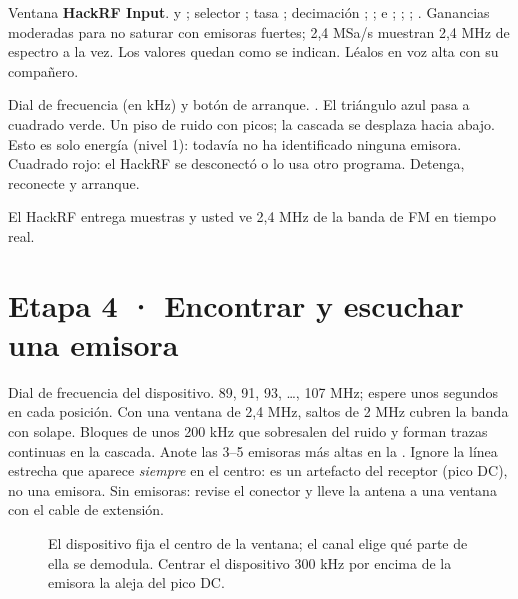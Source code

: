 {Ventana \textbf{HackRF Input}.}
{ y  ; selector ; tasa ; decimación ;  ;  e  ;  ;  ;  .}
{Ganancias moderadas para no saturar con emisoras fuertes; 2,4 MSa/s muestran 2,4 MHz de espectro a la vez.}
{Los valores quedan como se indican.}
{Léalos en voz alta con su compañero.}
{}

{Dial de frecuencia (en kHz) y botón de arranque.}
{. El triángulo azul pasa a cuadrado verde.}
{}
{Un piso de ruido con picos; la cascada se desplaza hacia abajo.}
{Esto es solo energía (nivel 1): todavía no ha identificado ninguna emisora.}
{Cuadrado rojo: el HackRF se desconectó o lo usa otro programa. Detenga, reconecte y arranque.}


\begin{logro}
El HackRF entrega muestras y usted ve 2,4 MHz de la banda de FM en tiempo real.
\end{logro}

\section{Etapa 4 · Encontrar y escuchar una emisora}
\label{sec:w-fm}


{Dial de frecuencia del dispositivo.}
{89, 91, 93, \ldots, 107 MHz; espere unos segundos en cada posición.}
{Con una ventana de 2,4 MHz, saltos de 2 MHz cubren la banda con solape.}
{Bloques de unos 200 kHz que sobresalen del ruido y forman trazas continuas en la cascada.}
{Anote las 3--5 emisoras más altas en la . Ignore la línea estrecha que aparece \emph{siempre} en el centro: es un artefacto del receptor (pico DC), no una emisora.}
{Sin emisoras: revise el conector y lleve la antena a una ventana con el cable de extensión.}

\begin{figure}[H]
\centering
\resizebox{0.9\linewidth}{!}{}
\caption{El dispositivo fija el centro de la ventana; el canal elige qué parte de ella se demodula. Centrar el dispositivo 300 kHz por encima de la emisora la aleja del pico DC.}
\label{fig:offset}
\end{figure}

